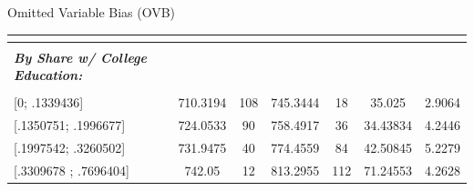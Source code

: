 \documentclass[notes,10pt, aspectratio=169]{beamer}
\begin{document}
\begin{frame}{Omitted Variable Bias (OVB)}
\begin{center}
{\begin{tabular}{l|cc|cc|cc|}
            \multicolumn{1}{|l|}{} &                                                                &                                &                                                                &                                & \multicolumn{1}{c|}{}                                             &                      \\\hline
            \multicolumn{1}{|l|}{} &                                                                &                                &                                                                &                                & \multicolumn{1}{c|}{}                                             &                      \\
            \multicolumn{1}{|l|}{\textbf{\textit{By Share w/ College Education:}}} &                                                                &                                &                                                                &                                & \multicolumn{1}{c|}{}                                             &                      \\
            \multicolumn{1}{|l|}{} &                                                                &                                &                                                                &                                & \multicolumn{1}{c|}{}                                             &                      \\
            \multicolumn{1}{|l|}{{[}0; .1339436{]}}                       & 710.3194                                                       & 108                            & 745.3444                                                       & 18                             & \multicolumn{1}{c|}{35.025}                                       & 2.9064               \\
            \multicolumn{1}{|l|}{{[}.1350751; .1996677{]}}                & 724.0533                                                       & 90                             & 758.4917                                                       & 36                             & \multicolumn{1}{c|}{34.43834}                                     & 4.2446               \\
            \multicolumn{1}{|l|}{{[}.1997542; .3260502{]}}                & 731.9475                                                       & 40                             & 774.4559                                                       & 84                             & \multicolumn{1}{c|}{42.50845}                                     & 5.2279               \\
            \multicolumn{1}{|l|}{{[}.3309678 ; .7696404{]}}               & 742.05                                                         & 12                             & 813.2955                                                       & 112                            & \multicolumn{1}{c|}{71.24553}                                     & 4.2628               \\ \hline
            \end{tabular}
            
}
\end{center}
\end{frame}
\end{document}
